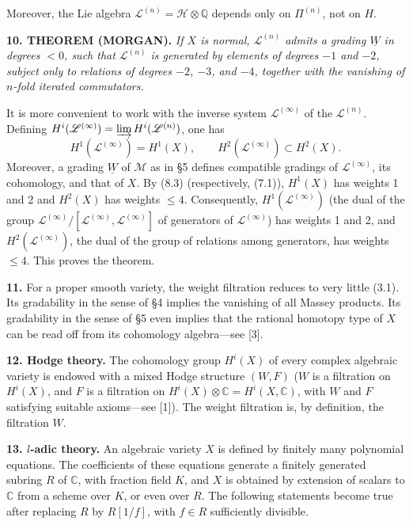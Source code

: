 \documentclass[8pt]{extarticle}
\newcommand{\NumPara}[1]{\par\noindent\textbf{#1}\enspace}
\newcommand{\TheoremPara}[1]{\par\noindent\textbf{#1}\enspace\itshape}
\newcommand{\EndTheorem}{\par\normalfont}
\newcommand{\Q}{\mathbb{Q}}
\newcommand{\C}{\mathbb{C}}
\newcommand{\Wg}{\underline{W}}
\newcommand{\Mmin}{\mathscr{M}}
\newcommand{\LieH}{\mathscr{H}}
\newcommand{\LieL}{\mathscr{L}}
\begin{document}
Moreover, the Lie algebra \(\LieL^{(n)}=\LieH\otimes\Q\) depends only on \(\Pi^{(n)}\), not on \(H\).

\TheoremPara{10. THEOREM (MORGAN).} If \(X\) is normal, \(\LieL^{(n)}\) admits a grading \(\Wg\) in degrees \(<0\), such that \(\LieL^{(n)}\) is generated by elements of degrees \(-1\) and \(-2\), subject only to relations of degrees \(-2\), \(-3\), and \(-4\), together with the vanishing of \(n\)-fold iterated commutators.\EndTheorem

It is more convenient to work with the inverse system \(\LieL^{(\infty)}\) of the \(\LieL^{(n)}\). Defining \(H^i(\LieL^{(\infty)})=\varinjlim H^i(\LieL^{(n)})\), one has
\[
H^1(\LieL^{(\infty)})=H^1(X),\qquad H^2(\LieL^{(\infty)})\subset H^2(X).
\]
Moreover, a grading \(\Wg\) of \(\Mmin\) as in §5 defines compatible gradings of \(\LieL^{(\infty)}\), its cohomology, and that of \(X\). By (8.3) (respectively, (7.1)), \(H^1(X)\) has weights 1 and 2 and \(H^2(X)\) has weights \(\le4\). Consequently, \(H^1(\LieL^{(\infty)})\) (the dual of the group \(\LieL^{(\infty)}/[\LieL^{(\infty)},\LieL^{(\infty)}]\) of generators of \(\LieL^{(\infty)}\)) has weights 1 and 2, and \(H^2(\LieL^{(\infty)})\), the dual of the group of relations among generators, has weights \(\le4\). This proves the theorem.

\NumPara{11.} For a proper smooth variety, the weight filtration reduces to very little (3.1). Its gradability in the sense of §4 implies the vanishing of all Massey products. Its gradability in the sense of §5 even implies that the rational homotopy type of \(X\) can be read off from its cohomology algebra---see [3].

\NumPara{12. Hodge theory.} The cohomology group \(H^i(X)\) of every complex algebraic variety is endowed with a mixed Hodge structure \((W,F)\) (\(W\) is a filtration on \(H^i(X)\), and \(F\) is a filtration on \(H^i(X)\otimes\C=H^i(X,\C)\), with \(W\) and \(F\) satisfying suitable axioms---see [1]). The weight filtration is, by definition, the filtration \(W\).

\NumPara{13. \(l\)-adic theory.} An algebraic variety \(X\) is defined by finitely many polynomial equations. The coefficients of these equations generate a finitely generated subring \(R\) of \(\C\), with fraction field \(K\), and \(X\) is obtained by extension of scalars to \(\C\) from a scheme over \(K\), or even over \(R\). The following statements become true after replacing \(R\) by \(R[1/f]\), with \(f\in R\) sufficiently divisible.
\end{document}
